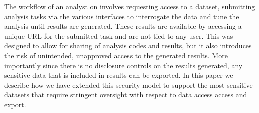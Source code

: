 The workflow of an analyst on \NAME involves requesting access to a dataset, submitting analysis
tasks via the various interfaces to interrogate the data and tune the analysis until results are generated.
These results are available by accessing a unique URL for the submitted task and are not tied to any user.
This was designed to allow for sharing of analysis codes and results, but it also introduces the risk
of unintended, unapproved access to the generated results. More importantly since there is no disclosure
controls on the results generated, any sensitive data that is included in results can be exported.
In this paper we describe how we have extended this security model to support the most sensitive datasets
that require stringent oversight with respect to data access access and export.



